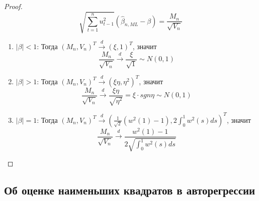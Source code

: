 \documentclass[12pt]{article}
\theoremstyle{basic_theorem}
\begin{document}
\begin{proof}
    \[\sqrt{\sum_{t=1}^nu^2_{t-1}}(\widehat{\beta}_{n,ML}-\beta)=\frac{M_n}{\sqrt{V_n}}\]
    \begin{enumerate}
        \item \underline{$|\beta|<1$}: Тогда $(M_n,V_n)^T\xrightarrow{d}(\xi,1)^T$, значит 
        \[\frac{M_n}{\sqrt{V_n}}\xrightarrow{d}\frac{\xi}{\sqrt{1}}\sim N(0,1)\]
        \item \underline{$|\beta|>1$}: Тогда $(M_n,V_n)^T\xrightarrow{d}(\xi\eta,\eta^2)^T$, значит 
        \[\frac{M_n}{\sqrt{V_n}}\xrightarrow{d}\frac{\xi\eta}{\sqrt{\eta^2}}=\xi\cdot sgn\eta\sim N(0,1)\]
        \item \underline{$|\beta|=1$}: Тогда $(M_n,V_n)^T\xrightarrow{d}\left(\frac{1}{\sqrt{2}}(w^2(1)-1),2\int_0^1w^2(s)ds\right)^T$, значит 
        \[\frac{M_n}{\sqrt{V_n}}\xrightarrow{d}\frac{w^2(1)-1}{2\sqrt{\int_0^1w^2(s)ds}}\]
    \end{enumerate}
\end{proof}
\subsection{Об оценке наименьших квадратов в авторегрессии}
\end{document}
